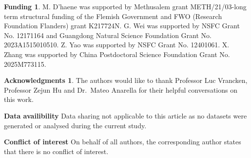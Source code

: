 \documentclass[reqno]{amsart}%
\theoremstyle{definition}
\newtheorem*{fund}{Funding}
\newtheorem*{acknow}{Acknowledgments}
\numberwithin{equation}{section}
\begin{document}
	
		\begin{fund}
		M. D'haene was supported by Methusalem grant METH/21/03-long term structural funding of the Flemish Government and FWO (Research Foundation Flanders) grant K217724N. 
		G. Wei was supported by NSFC Grant No. 12171164 and Guangdong Natural Science Foundation Grant No. 2023A1515010510. 
		Z. Yao was supported by NSFC Grant No. 12401061. 
		X. Zhang was supported by China Postdoctoral Science Foundation Grant No. 2025M773115. 
	\end{fund}
	
	\begin{acknow}
		The authors would like to thank Professor Luc Vrancken, Professor Zejun Hu and Dr.\ Mateo Anarella for their helpful         conversations on this work. 
	\end{acknow}
	
	\vskip 0.1cm
	\noindent\textbf{Data availibility}
	Data sharing not applicable to this article as no datasets were generated or analysed during the current study.
	
	\vskip 0.1cm
	\noindent\textbf{Conflict of interest} On behalf of all authors, the corresponding author states that there is no conflict of interest.
	
\end{document}
